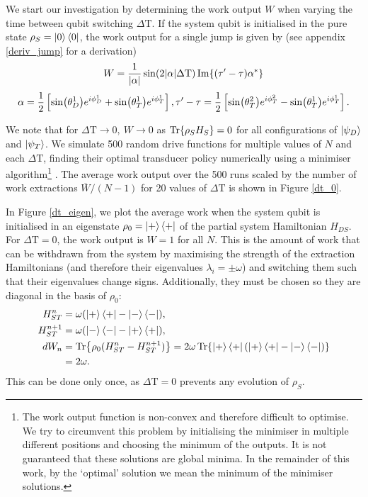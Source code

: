 We start our investigation by determining the work output $W$ when varying the time between qubit switching $\Delta \mathrm{T}$.
If the system qubit is initialised in the pure state $\rho_S = \ket{0} \bra{0}$, the work output for a single jump is given by (see appendix \ref{deriv_jump} for a derivation)
\begin{equation} \label{single_work}
	W = \frac{1}{\abs{\alpha}} \sin(2\abs{\alpha}\Delta \mathrm{T}) \Im{(\tau' - \tau) \alpha^*}
\end{equation}
\begin{equation*}
	\alpha = \frac{1}{2} \left[\sin(\theta_D^1) e^{i\phi_D^1} + \sin(\theta_T^1) e^{i\phi_T^1}\right], \\
	\tau' - \tau = \frac{1}{2} \left[ \sin(\theta_T^2)e^{i\phi_T^2} - \sin(\theta_T^1)e^{i\phi_T^1} \right].
\end{equation*}

We note that for $\Delta \mathrm{T} \to 0, \ W \to 0$ as $\Tr{\rho_S H_S} = 0$ for all configurations of $\ket{\psi_D}$ and $ \ket{\psi_T}$.
We simulate 500 random drive functions for multiple values of $N$ and each $\Delta \mathrm{T}$, finding their optimal transducer policy numerically using a minimiser algorithm\footnote{The work output function is non-convex and therefore difficult to optimise. We try to circumvent this problem by initialising the minimiser in multiple different positions and choosing the minimum of the outputs. It is not guaranteed that these solutions are global minima. In the remainder of this work, by the `optimal' solution we mean the minimum of the minimiser solutions.} \cite{2020SciPy-NMeth}. The average work output over the 500 runs scaled by the number of work extractions $\overline{W}/(N-1)$ for 20 values of $\Delta \mathrm{T}$ is shown in Figure \ref{dt_0}.

In Figure \ref{dt_eigen}, we plot the average work when the system qubit is initialised in an eigenstate $\rho_0 = \ket{+}\bra{+}$ of the partial system Hamiltonian $H_{DS}$.
For $\Delta \mathrm{T} = 0$, the work output is $W = 1$ for all $N$.
This is the amount of work that can be withdrawn from the system by maximising the strength of the extraction Hamiltonians (and therefore their eigenvalues $\lambda_i = \pm \omega$) and switching them such that their eigenvalues change signs. Additionally, they must be chosen so they are diagonal in the basis of $\rho_0$:
\begin{align*}
	H_{ST}^n &= \omega (\ket{+}\bra{+} - \ket{-}\bra{-}), \\
	H_{ST}^{n+1} &= \omega (\ket{-}\bra{-} - \ket{+}\bra{+}), \\
	dW_n &= \Tr{\rho_0 (H_{ST}^n - H_{ST}^{n+1})} = 2 \omega \Tr{\ket{+}\bra{+} (\ket{+}\bra{+} - \ket{-}\bra{-}) } \\
	&= 2 \omega.
\end{align*}
This can be done only once, as $\Delta \mathrm{T} = 0$ prevents any evolution of $\rho_S$.

